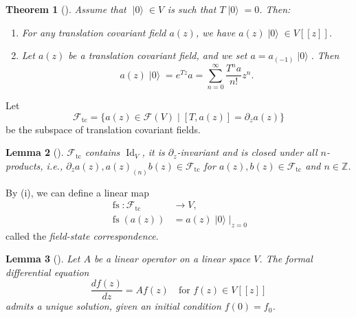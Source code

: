 \documentclass[a4paper, 12pt, reqno]{amsart}
\newtheorem{theorem}{Theorem}[section]
\newtheorem{lemma}[theorem]{Lemma}
\theoremstyle{remark}
\DeclareMathOperator{\Id}{Id}
\DeclareMathOperator{\vac}{|0\rangle}
\DeclareMathOperator{\zero}{\overline{0}}
\DeclareMathOperator{\fs}{fs}
\DeclareMathOperator{\tc}{tc}
\begin{document}
\begin{theorem}[{\cite[Lemma 1]{callegaro_introduction_2017}}]
  \label{thr:14}
  Assume that $\vac \in V_{\zero}$ is such that $T\vac = 0$.
  Then:
  \begin{enumerate}
  \item For any translation covariant field $a(z)$, we have $a(z)\vac \in V[[z]]$.
  \item Let $a(z)$ be a translation covariant field, and we set $a = a_{(-1)}\vac$.
    Then
    \begin{equation*}
      a(z)\vac = e^{Tz}a = \sum_{n = 0}^{\infty}\frac{T^na}{n!}z^n.
    \end{equation*}
  \end{enumerate}
\end{theorem}

Let
\begin{equation*}
  \mathcal{F}_{\tc} = \{a(z) \in \mathcal{F}(V) \mid [T, a(z)] = \partial_za(z)\}
\end{equation*}
be the subspace of translation covariant fields.

\begin{lemma}[{\cite[Lemma 3]{callegaro_introduction_2017}}]
  \label{lmm:5}
  $\mathcal{F}_{\tc}$ contains $\Id_V$, it is $\partial_z$-invariant and is closed under all $n$-products, i.e., $\partial_za(z), a(z)_{(n)}b(z) \in \mathcal{F}_{\tc}$ for $a(z), b(z) \in \mathcal{F}_{\tc}$ and $n \in \mathbb{Z}$.
\end{lemma}

By (i), we can define a linear map
\begin{align*}
  \fs: \mathcal{F}_{\tc} &\to V, \\
  \fs(a(z)) &= a(z)\vac|_{z = 0}
\end{align*}
called the \emph{field-state correspondence}.

\begin{lemma}[{\cite[Proposition 4.3.2]{nozaradan_introduction_2008}}]
  \label{lmm:6}
  Let $A$ be a linear operator on a linear space $V$.
  The formal differential equation
  \begin{equation*}
    \frac{df(z)}{dz} = Af(z) \quad \text{for $f(z) \in V[[z]]$}
  \end{equation*}
  admits a unique solution, given an initial condition $f(0) = f_0$.
\end{lemma}
\end{document}
